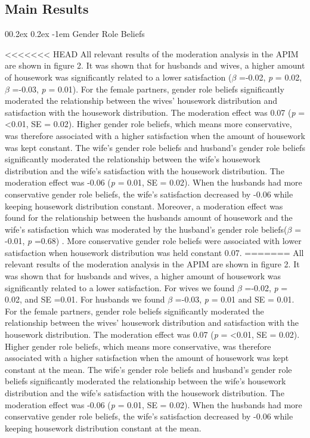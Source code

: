 \documentclass[
  man,floatsintext]{apa6}
\makeatletter
\let\oldparagraph\paragraph
\renewcommand{\paragraph}[1]{\oldparagraph{#1}\mbox{}}
\renewcommand{\paragraph}{\@startsection{paragraph}{4}{\parindent}%
  {0\baselineskip \@plus 0.2ex \@minus 0.2ex}%
  {-1em}%
  {\normalfont\normalsize\bfseries\itshape\typesectitle}}
\makeatother
\begin{document}
\hypertarget{main-results}{%
\subsection{Main Results}\label{main-results}}

\hypertarget{gender-role-beliefs}{%
\paragraph{Gender Role Beliefs}\label{gender-role-beliefs}}

<<<<<<< HEAD
All relevant results of the moderation analysis in the APIM are shown in figure 2. It was shown that for husbands and wives, a higher amount of housework was significantly related to a lower satisfaction (\(\beta\) =-0.02, \emph{p} = 0.02,\(\beta\) =-0.03, \emph{p} = 0.01).
For the female partners, gender role beliefs significantly moderated the relationship between the wives' housework distribution and satisfaction with the housework distribution. The moderation effect was 0.07 (\emph{p} = \textless0.01, SE = 0.02). Higher gender role beliefs, which means more conservative, was therefore associated with a higher satisfaction when the amount of housework was kept constant. The wife's gender role beliefs and husband's gender role beliefs significantly moderated the relationship between the wife's housework distribution and the wife's satisfaction with the housework distribution. The moderation effect was -0.06 (\emph{p} = 0.01, SE = 0.02). When the husbands had more conservative gender role beliefs, the wife's satisfaction decreased by -0.06 while keeping housework distribution constant.
Moreover, a moderation effect was found for the relationship between the husbands amount of housework and the wife's satisfaction which was moderated by the husband's gender role beliefs(\(\beta\) = -0.01, \emph{p} =0.68) . More conservative gender role beliefs were associated with lower satisfaction when housework distribution was held constant 0.07.
=======
All relevant results of the moderation analysis in the APIM are shown in figure 2. It was shown that for husbands and wives, a higher amount of housework was significantly related to a lower satisfaction. For wives we found \(\beta\) =-0.02, \emph{p} = 0.02, and SE =0.01. For husbands we found \(\beta\) =-0.03, \emph{p} = 0.01 and SE = 0.01.
For the female partners, gender role beliefs significantly moderated the relationship between the wives' housework distribution and satisfaction with the housework distribution. The moderation effect was 0.07 (\emph{p} = \textless0.01, SE = 0.02). Higher gender role beliefs, which means more conservative, was therefore associated with a higher satisfaction when the amount of housework was kept constant at the mean. The wife's gender role beliefs and husband's gender role beliefs significantly moderated the relationship between the wife's housework distribution and the wife's satisfaction with the housework distribution. The moderation effect was -0.06 (\emph{p} = 0.01, SE = 0.02). When the husbands had more conservative gender role beliefs, the wife's satisfaction decreased by -0.06 while keeping housework distribution constant at the mean.
\end{document}
